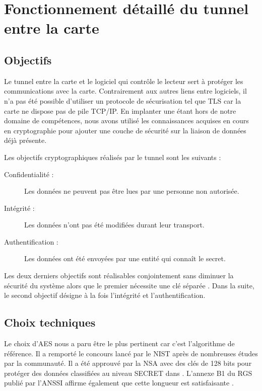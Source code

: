 \documentclass[a4paper,11pt,french]{article}
\begin{document}
\clearpage

\appendix

\section{Fonctionnement détaillé du tunnel entre la carte}
\label{TunnelSS}


\subsection{Objectifs}
Le tunnel entre la carte et le logiciel qui contr\^ole le lecteur sert à 
protéger les communications avec la carte. Contrairement aux autres liens entre 
logiciels, il n'a pas été possible d'utiliser un protocole de sécurisation tel 
que TLS car la carte ne dispose pas de pile TCP/IP. En implanter une étant hors
de notre domaine de compétences, nous avons utilisé les connaissances acquises 
en cours en cryptographie pour ajouter une couche de sécurité sur la liaison de 
données déjà présente. 

Les objectifs cryptographiques réalisés par le tunnel sont les suivants : 
\begin{description}
    \item[Confidentialité :] Les données ne peuvent pas être lues par une 
        personne non autorisée.
    \item[Intégrité :] Les données n'ont pas été modifiées durant leur 
        transport.
    \item[Authentification :] Les données ont été envoyées par une entité qui 
        connaît le secret.
\end{description}
Les deux derniers objectifs sont réalisables conjointement sans diminuer la 
sécurité du système alors que le premier nécessite une clé séparée \cite[section 2.5.1]{RGS ANSSI}. Dans la 
suite, le second objectif désigne à la fois l'intégrité et l'authentification. 


\subsection{Choix techniques}


Le choix d'AES nous a paru être le plus pertinent car c'est l'algorithme de référence. Il a remporté le concours lancé par le NIST après de nombreuses études par la communauté.
 Il a été approuvé par la NSA avec des clés de 128
bits pour protéger des données classifiées au niveau SECRET dans \cite{NSA}. L'annexe B1 du RGS
publié par l'ANSSI affirme également que cette longueur est satisfaisante \cite{RGS ANSSI}. 
\end{document}
